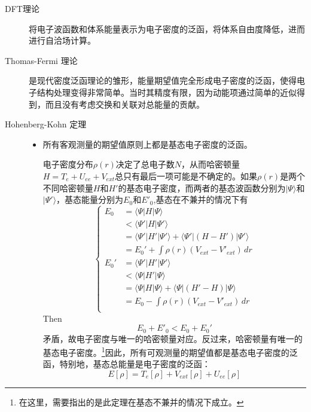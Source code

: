 \documentclass{article}
\numberwithin{equation}{section}
\newcommand{\ket}[1]{| #1 \rangle}
\newcommand{\bracketl}[3]{\langle #1 | #2 | #3 \rangle}
\begin{document}
  \begin{description}
    \item[DFT理论]将电子波函数和体系能量表示为电子密度的泛函，将体系自由度降低，进而进行自洽场计算。
    
    \item[Thomas-Fermi 理论]
      是现代密度泛函理论的雏形，能量期望值完全形成电子密度的泛函，使得电子结构处理变得非常简单。当时其精度有限，因为动能项通过简单的近似得到，而且没有考虑交换和关联对总能量的贡献。
    \item[Hohenberg-Kohn 定理]
    \begin{itemize}
      \item 所有客观测量的期望值原则上都是基态电子密度的泛函。
  
      电子密度分布$\rho(r)$决定了总电子数$N$，从而哈密顿量$H=T_e+U_{ee}+V_{ext}$总只有最后一项可能是不确定的。如果$\rho(r)$是两个不同哈密顿量$H$和$H'$的基态电子密度，而两者的基态波函数分别为$\ket{\Psi}$和$\ket{\Psi'}$，基态能量分别为$E_0$和$E'_0$,基态在不兼并的情况下有
      \begin{equation}
      \begin{cases}
      E_0&=\bracketl{\Psi}{H}{\Psi}\\
      &<\bracketl{\Psi'}{H}{\Psi'}\\
      &=\bracketl{\Psi'}{H'}{\Psi'}+\bracketl{\Psi'}{(H-H')}{\Psi'}\\
      &=E_0'+\int \rho(r)(V_{ext}-V'_{ext})\,dr\\
      E_0'&=\bracketl{\Psi'}{H'}{\Psi'}\\&
      <\bracketl{\Psi}{H'}{\Psi}\\
      &=\bracketl{\Psi}{H}{\Psi}+\bracketl{\Psi}{(H'-H)}{\Psi}\\
      &=E_0-\int \rho(r)(V_{ext}-V'_{ext})\,dr\\
      \end{cases}
      \end{equation}
      Then
      \begin{equation}
      E_0+E'_0<E_0+E_0'
      \end{equation}
      矛盾，故电子密度与唯一的哈密顿量对应。反过来，哈密顿量有唯一的基态电子密度。\footnote{在这里，需要指出的是此定理在基态不兼并的情况下成立。}因此，所有可观测量的期望值都是基态电子密度的泛函，特别地，基态总能量是电子密度的泛函：
      \begin{equation}
      E[\rho]=T_e[\rho]+V_{ext}[\rho]+U_{ee}[\rho]
      \end{equation}
  

\end{itemize}
\end{description}
\end{document}
